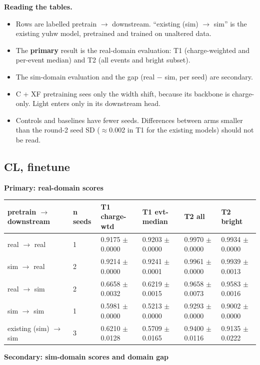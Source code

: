 \documentclass[10pt,a4paper]{article}
\begin{document}
\textbf{Reading the tables.}

\begin{itemize}
\item Rows are labelled pretrain $\rightarrow$ downstream. ``existing (sim) $\rightarrow$ sim'' is the existing yuhw model, pretrained and trained on unaltered data.
\item The \textbf{primary} result is the real-domain evaluation: T1 (charge-weighted and per-event median) and T2 (all events and bright subset).
\item The sim-domain evaluation and the gap (real $-$ sim, per seed) are secondary.
\item C + XF pretraining sees only the width shift, because its backbone is charge-only. Light enters only in its downstream head.
\item Controls and baselines have fewer seeds. Differences between arms smaller than the round-2 seed SD ($\approx$0.002 in T1 for the existing models) should not be read.
\end{itemize}
\subsection{CL, finetune}
\textbf{Primary: real-domain scores}

\begin{center}\footnotesize
\setlength{\tabcolsep}{3pt}\renewcommand{\arraystretch}{1.15}
\begin{tabularx}{\linewidth}{LLLLLL}
\toprule
\textbf{pretrain $\rightarrow$ downstream} & \textbf{n seeds} & \textbf{T1 charge-wtd} & \textbf{T1 evt-median} & \textbf{T2 all} & \textbf{T2 bright} \\
\midrule
real $\rightarrow$ real & 1 & 0.9175 $\pm$ 0.0000 & 0.9203 $\pm$ 0.0000 & 0.9970 $\pm$ 0.0000 & 0.9934 $\pm$ 0.0000 \\
sim $\rightarrow$ real & 2 & 0.9214 $\pm$ 0.0000 & 0.9241 $\pm$ 0.0001 & 0.9961 $\pm$ 0.0000 & 0.9939 $\pm$ 0.0013 \\
real $\rightarrow$ sim & 2 & 0.6658 $\pm$ 0.0032 & 0.6219 $\pm$ 0.0015 & 0.9658 $\pm$ 0.0073 & 0.9583 $\pm$ 0.0016 \\
sim $\rightarrow$ sim & 1 & 0.5981 $\pm$ 0.0000 & 0.5213 $\pm$ 0.0000 & 0.9293 $\pm$ 0.0000 & 0.9002 $\pm$ 0.0000 \\
existing (sim) $\rightarrow$ sim & 3 & 0.6210 $\pm$ 0.0128 & 0.5709 $\pm$ 0.0165 & 0.9400 $\pm$ 0.0116 & 0.9135 $\pm$ 0.0222 \\
\bottomrule
\end{tabularx}
\end{center}
\textbf{Secondary: sim-domain scores and domain gap}
\end{document}
